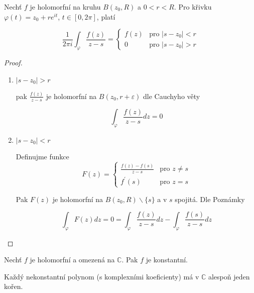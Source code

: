 \begin{vetal}
Nechť $f$ je holomorfní na kruhu $B(z_0, R)$ a $0<r<R$. Pro křivku $\varphi(t) = z_0 + r e^{it}$, $t \in [0,2\pi]$, platí

\begin{equation}
\frac{1}{2 \pi i} \int_\varphi \frac{f(z)}{z-s}  = \left\{ \begin{array}{ll}
 f(z) & \textrm{pro $|s-z_0| < r$} \nonumber\\
 0 & \textrm{pro $| s-z_0 | > r$}
  \end{array} \right.
\end{equation}
\end{vetal}

\begin{proof}
\begin{enumerate}
\item $|s-z_0| > r$

pak $\frac{f(z)}{z-s}$ je holomorfní na $B(z_0, r + \varepsilon)$ dle Cauchyho věty

$$\int_\varphi \frac{f(z)}{z-s} dz = 0$$

\item $|s-z_0| < r$

Definujme funkce 
\begin{equation}
F(z)  = \left\{ \begin{array}{ll}
 \frac{f(z)-f(s)}{z-s} & \textrm{pro $z \neq s$} \nonumber\\
 f^\prime(s) & \textrm{pro $z=s$}
  \end{array} \right.
\end{equation}

Pak $F(z)$ je holomorfní na $B(z_0, R) \backslash \{ s \}$ a v $s$ spojitá. Dle Poznámky

$$\int_\varphi F(z) dz = 0 = \int_\varphi \frac{f(z)}{z-s} dz - \int_\varphi \frac{f(s)}{z-s} dz$$
\end{enumerate}
\end{proof}


\begin{vetat}[Liouville]
\label{Liouville}

Nechť $f$ je holomorfní a omezená na $\mathbb{C}$. Pak $f$ je konstantní.
\end{vetat}

\begin{vetal}
Každý nekonstantní polynom (s komplexními koeficienty) má v $\mathbb{C}$ alespoň jeden kořen.
\end{vetal}

